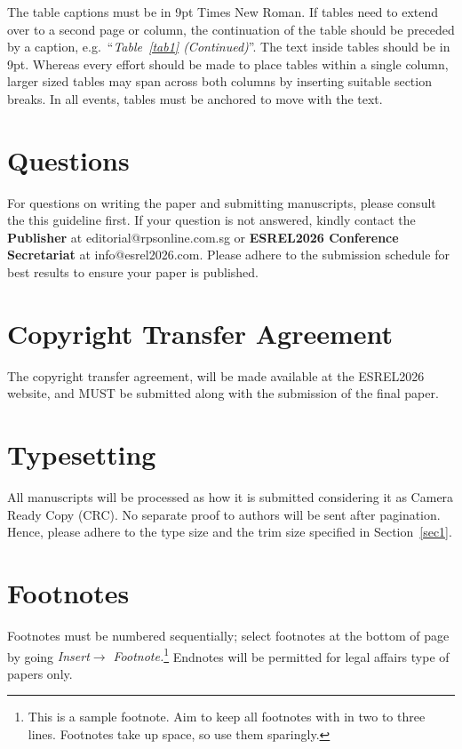 \documentclass[twocolumn]{rps-esrel2026}
\begin{document}
The table captions must be in 9pt Times New Roman.  If tables need to
extend over to a second page or column, the continuation of the table
should be preceded by a caption, e.g.~``{\it Table~\ref{tab1} (Continued)}''. %
The text inside tables should be in 9pt.  Whereas every effort should be made to place tables within a \hbox{single} column, larger sized tables may span across both columns by inserting suitable \hbox{section} breaks.  In all events, tables must be anchored to move with the text. 

\section{Questions}

For questions on writing the paper and submitting manuscripts, please consult the this guideline first.  If your question is not answered,
kindly contact the {\bf Publisher} at editorial@rpsonline.com.sg or
{\bf ESREL2026 Conference Secretariat} at info@esrel2026.com.  Please adhere
to the submission schedule for best results to ensure your paper is published.

\section{Copyright Transfer Agreement}

The copyright transfer agreement, will be made available at the ESREL2026 website, and MUST be submitted along with the submission of the final paper.


\section{Typesetting}

All manuscripts will be processed as how it is submitted considering it as Camera Ready Copy (CRC). No separate proof to authors will be sent after pagination. Hence,
please adhere to the type size and the trim size specified in
Section~\ref{sec1}.

\section{Footnotes}

Footnotes must be numbered sequentially; select footnotes at the bottom of page by going {\it Insert$\longrightarrow$ Footnote.}\footnote{This is a sample footnote.  Aim to keep all footnotes with in two to three lines.  Footnotes take up space, so use them sparingly.} Endnotes will be permitted for legal affairs type of papers only.
\end{document}
